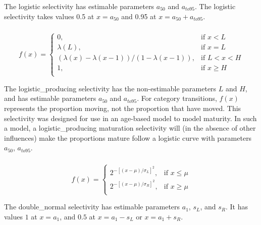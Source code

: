 The logistic selectivity has estimable parameters $a_{50}$ and $a_{to95}$. The logistic selectivity takes values 0.5 at $x=a_{50}$ and 0.95 at $x=a_{50}+a_{to95}$. 

\subsubsection*{}

\begin{equation} 
f(x)=\begin{cases}
	  0, & \text{if $x < L$} \\
	  \lambda(L), & \text{if $x=L$} \\
	  \left( \lambda(x)-\lambda(x-1) \right) / \left( 1-\lambda(x-1) \right), & \text{if $L < x < H$} \\
	  1, & \text{if $x \ge H$} \\  
  \end{cases}
\end{equation}

The logistic\_producing selectivity has the non-estimable parameters $L$ and $H$, and has estimable parameters $a_{50}$ and $a_{to95}$. For category transitions, $f(x)$ represents the proportion moving, not the proportion that have moved. This selectivity was designed for use in an age-based model to model maturity. In such a model, a logistic\_producing maturation selectivity will (in the absence of other influences) make the proportions mature follow a logistic curve with parameters $a_{50}$, $a_{to95}$.

\subsubsection*{}

\begin{equation}
  f(x) = \begin{cases}
    2^{-[(x- \mu)/\sigma_L ]^2}, & \text{if $x \leq \mu$} \\
    2^{-[(x- \mu)/\sigma_R ]^2}, & \text{if $x \ge \mu$}\\
  \end{cases}
\end{equation} 

The double\_normal selectivity has estimable parameters $a_1$, $s_L$, and $s_R$. It has values $1$ at $x=a_1$, and $0.5$ at $x=a_1-s_L$ or $x=a_1+s_R$. 

\subsubsection*{}


